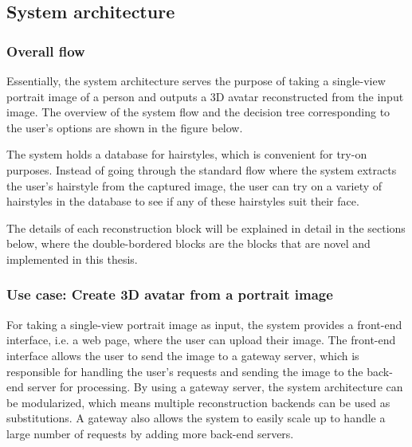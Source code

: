 \subsection{System architecture}

\subsubsection{Overall flow}

Essentially, the system architecture serves the purpose of taking a single-view portrait image of a person and outputs a 3D avatar reconstructed from the input image. The overview of the system flow and the decision tree corresponding to the user's options are shown in the figure below.

\clearpage


\clearpage

The system holds a database for hairstyles, which is convenient for try-on purposes. Instead of going through the standard flow where the system extracts the user's hairstyle from the captured image, the user can try on a variety of hairstyles in the database to see if any of these hairstyles suit their face.

The details of each reconstruction block will be explained in detail in the sections below, where the double-bordered blocks are the blocks that are novel and implemented in this thesis.

\subsubsection{Use case: Create 3D avatar from a portrait image}


For taking a single-view portrait image as input, the system provides a front-end interface, i.e. a web page, where the user can upload their image. The front-end interface allows the user to send the image to a gateway server, which is responsible for handling the user's requests and sending the image to the back-end server for processing. By using a gateway server, the system architecture can be modularized, which means multiple reconstruction backends can be used as substitutions. A gateway also allows the system to easily scale up to handle a large number of requests by adding more back-end servers.

